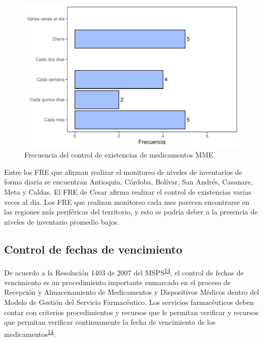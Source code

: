 \documentclass[
]{book}
\begin{document}
\begin{figure}
\includegraphics[width=1\linewidth]{InformeFinal_files/figure-latex/FrecControlExistencias-1} \caption{Frecuencia del control de existencias de medicamentos MME}\label{fig:FrecControlExistencias}
\end{figure}

Entre los FRE que afirman realizar el monitoreo de niveles de inventarios de forma diaria se encuentran Antioquia, Córdoba, Bolívar, San Andrés, Casanare, Meta y Caldas. El FRE de Cesar afirma realizar el control de existencias varias veces al día. Los FRE que realizan monitoreo cada mes parecen encontrarse en las regiones más periféricas del territorio, y esto se podría deber a la presencia de niveles de inventario promedio bajos.

\hypertarget{control-de-fechas-de-vencimiento}{%
\subsection{Control de fechas de vencimiento}\label{control-de-fechas-de-vencimiento}}

De acuerdo a la Resolución 1403 de 2007 del MSPS\textsuperscript{\protect\hyperlink{ref-MinisteriodeSaludyProteccionSocial2007}{14}}, el control de fechas de vencimiento es un procedimiento importante enmarcado en el proceso de Recepción y Almacenamiento de Medicamentos y Dispositivos Médicos dentro del Modelo de Gestión del Servicio Farmacéutico. Los servicios farmacéuticos deben contar con criterios procedimientos y recursos que le permitan verificar y recursos que permitan verificar continuamente la fecha de vencimiento de los medicamentos\textsuperscript{\protect\hyperlink{ref-MinisteriodeSaludyProteccionSocial2007}{14}}.
\end{document}
